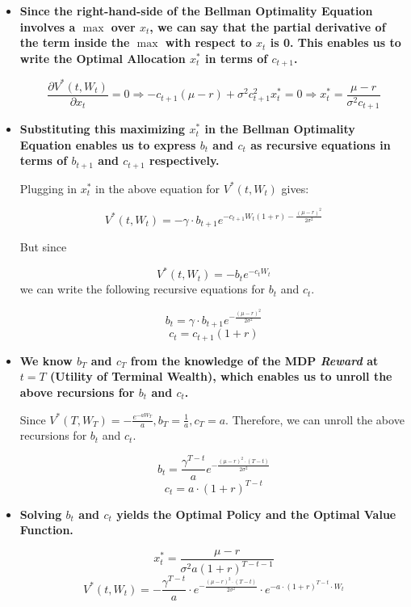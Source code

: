 \documentclass[12pt]{amsart}
\begin{document}
\begin{itemize}
\item {\bf Since the right-hand-side of the Bellman Optimality Equation involves a $\max$ over $x_t$, we can say that the partial derivative of the term inside the $\max$ with respect to $x_t$ is 0. This enables us to write the Optimal Allocation $x_t^*$ in terms of $c_{t+1}$.}

$$\frac {\partial V^*(t, W_t)} {\partial x_t} = 0 \Rightarrow -c_{t+1} (\mu - r) + \sigma^2 c_{t+1}^2 x^*_t = 0 \Rightarrow x^*_t = \frac {\mu - r} {\sigma^2 c_{t+1}}$$

\item {\bf Substituting this maximizing $x_t^*$ in the Bellman Optimality Equation enables us to express $b_t$ and $c_t$ as recursive equations in terms of $b_{t+1}$ and $c_{t+1}$ respectively.}

Plugging in $x^*_t$ in the above equation for $V^*(t, W_t)$ gives:

$$V^*(t, W_t) = - \gamma \cdot b_{t+1} e^{-c_{t+1} W_t (1 + r) - \frac {(\mu - r)^2} {2 \sigma^2}} $$

But since

$$V^*(t, W_t) = -b_t e^{-c_t W_t}$$ we can write the following recursive equations for $b_t$ and $c_t$.

$$b_t = \gamma \cdot b_{t+1} e^{- \frac {(\mu -r)^2} {2 \sigma^2}}$$
$$c_t = c_{t+1} (1 + r)$$

\item {\bf We know $b_T$ and $c_T$ from the knowledge of the MDP {\em Reward} at $t=T$ (Utility of Terminal Wealth), which enables us to unroll the above recursions for $b_t$ and $c_t$.}

Since $V^*(T, W_T) = - \frac {e^{-a W_T}} a, b_T = \frac 1 a, c_T = a$. Therefore, we can unroll the above recursions for $b_t$ and $c_t$.

$$b_t = \frac {\gamma^{T-t}} a e^{- \frac {(\mu - r)^2 \cdot (T-t)} {2 \sigma^2}}$$
$$c_t = a \cdot (1+ r)^{T-t}$$

\item {\bf Solving $b_t$ and $c_t$ yields the Optimal Policy and the Optimal Value Function.}

$$x^*_t = \frac {\mu - r} {\sigma^2 a (1+ r)^{T-t-1}}$$
$$V^*(t, W_t) = - \frac {\gamma^{T-t}} a \cdot e^{- \frac {(\mu - r)^2 \cdot (T-t)} {2 \sigma^2}} \cdot e^{- a \cdot (1+ r)^{T-t} \cdot W_t}$$

\end{itemize}
\end{document}
